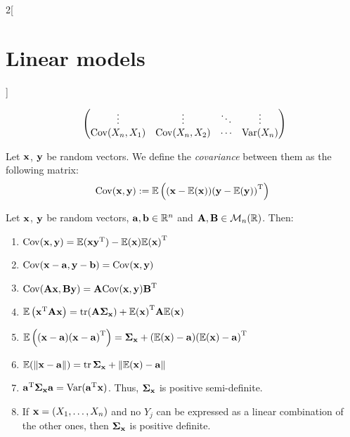 \documentclass[../../../main_math.tex]{subfiles}
\begin{document}
\begin{multicols}{2}[\section{Linear models}]
\begin{proposition}
$$\begin{pmatrix}
        \vdots        & \vdots        & \ddots & \vdots        \\
        \cov(X_n,X_1) & \cov(X_n,X_2) & \cdots & \Var(X_n)     \\
      \end{pmatrix}\!\!$$
  \end{proposition}
  \begin{definition}
    Let $\vf{x}$, $\vf{y}$ be random vectors. We define the \emph{covariance} between them as the following matrix:
    $$\cov(\vf{x},\vf{y}):=\Exp\left((\vf{x}-\Exp(\vf{x}))\transpose{(\vf{y}-\Exp(\vf{y}))}\right)$$
  \end{definition}
  \begin{proposition}
    Let $\vf{x}$, $\vf{y}$ be random vectors, $\vf{a},\vf{b}\in\RR^n$ and $\vf{A},\vf{B}\in\mathcal{M}_n(\RR)$. Then:
    \begin{enumerate}
      \item $\cov(\vf{x},\vf{y})=\Exp(\vf{x}\transpose{\vf{y}})-\Exp(\vf{x})\transpose{\Exp(\vf{x})}$
      \item $\cov(\vf{x}-\vf{a},\vf{y}-\vf{b})=\cov(\vf{x},\vf{y})$
      \item $\cov(\vf{Ax},\vf{By})=\vf{A}\cov(\vf{x},\vf{y})\transpose{\vf{B}}$
      \item $\Exp\left(\transpose{\vf{x}}\vf{Ax}\right)=\trace(\vf{A\Sigma_{\vf{x}}}) + \transpose{\Exp(\vf{x})}\vf{A}\Exp(\vf{x})$
      \item $\Exp\left((\vf{x}-\vf{a})\transpose{(\vf{x}-\vf{a})}\right)=\vf\Sigma_{\vf{x}}+(\Exp(\vf{x})-\vf{a})\transpose{(\Exp(\vf{x})-\vf{a})}$
      \item $\Exp(\norm{\vf{x}-\vf{a}})=\trace\vf\Sigma_{\vf{x}}+\norm{\Exp(\vf{x})-\vf{a}}$
      \item $\transpose{\vf{a}}\vf\Sigma_{\vf{x}}\vf{a}=\Var(\transpose{\vf{a}}\vf{x})$. Thus, $\vf\Sigma_{\vf{x}}$ is positive semi-definite.
      \item If $\vf{x}=(X_1,\ldots,X_n)$ and no $Y_j$ can be expressed as a linear combination of the other ones, then $\vf\Sigma_{\vf{x}}$ is positive definite.
    \end{enumerate}
  \end{proposition}

\end{multicols}
\end{document}
